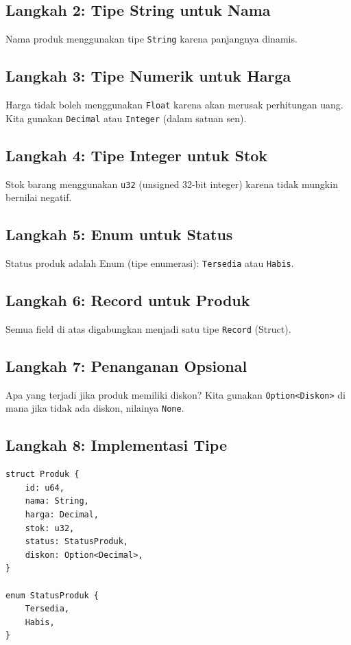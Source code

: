 \documentclass[11pt,a4paper]{article}
\begin{document}
	\subsection{Langkah 2: Tipe String untuk Nama}
	Nama produk menggunakan tipe \texttt{String} karena panjangnya dinamis.
	
	\subsection{Langkah 3: Tipe Numerik untuk Harga}
	Harga tidak boleh menggunakan \texttt{Float} karena akan merusak perhitungan uang. Kita gunakan \texttt{Decimal} atau \texttt{Integer} (dalam satuan sen).
	
	\subsection{Langkah 4: Tipe Integer untuk Stok}
	Stok barang menggunakan \texttt{u32} (unsigned 32-bit integer) karena tidak mungkin bernilai negatif.
	
	\subsection{Langkah 5: Enum untuk Status}
	Status produk adalah Enum (tipe enumerasi): \texttt{Tersedia} atau \texttt{Habis}.
	
	\subsection{Langkah 6: Record untuk Produk}
	Semua field di atas digabungkan menjadi satu tipe \texttt{Record} (Struct).
	
	\subsection{Langkah 7: Penanganan Opsional}
	Apa yang terjadi jika produk memiliki diskon? Kita gunakan \texttt{Option<Diskon>} di mana jika tidak ada diskon, nilainya \texttt{None}.
	
	\subsection{Langkah 8: Implementasi Tipe}
	
	\begin{lstlisting}[style=code]
struct Produk {
    id: u64,
    nama: String,
    harga: Decimal,
    stok: u32,
    status: StatusProduk,
    diskon: Option<Decimal>,
}
	
enum StatusProduk {
    Tersedia,
    Habis,
}
	\end{lstlisting}
	
\end{document}
